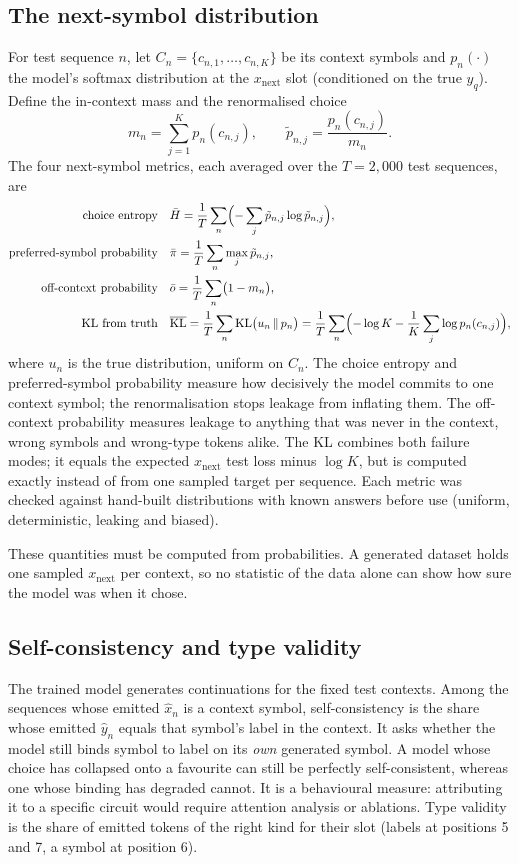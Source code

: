 \documentclass[11pt,a4paper]{article}
\newcommand{\xnext}{x_{\mathrm{next}}}
\newcommand{\yq}{y_{q}}
\newcommand{\KL}{\mathrm{KL}}
\begin{document}
\subsection{The next-symbol distribution}\label{sec:nextsym}
For test sequence $n$, let $C_n=\{c_{n,1},\dots,c_{n,K}\}$ be its context
symbols and $p_n(\cdot)$ the model's softmax distribution at the $\xnext$
slot (conditioned on the true $\yq$). Define the in-context mass and the
renormalised choice
\[
  m_n=\sum_{j=1}^{K}p_n(c_{n,j}),\qquad
  \tilde p_{n,j}=\frac{p_n(c_{n,j})}{m_n}.
\]
The four next-symbol metrics, each averaged over the $T=2{,}000$ test
sequences, are
\begin{align}
  \text{choice entropy}\quad &\bar H=\frac1T\sum_{n}\Bigl(-\sum_{j}\tilde p_{n,j}\log\tilde p_{n,j}\Bigr), \\
  \text{preferred-symbol probability}\quad &\bar\pi=\frac1T\sum_{n}\max_j\tilde p_{n,j}, \\
  \text{off-context probability}\quad &\bar o=\frac1T\sum_{n}\bigl(1-m_n\bigr), \\
  \text{KL from truth}\quad &\overline{\KL}=\frac1T\sum_{n}\KL\bigl(u_n\,\|\,p_n\bigr)
     =\frac1T\sum_{n}\Bigl(-\log K-\frac1K\sum_{j}\log p_n(c_{n,j})\Bigr),
\end{align}
where $u_n$ is the true distribution, uniform on $C_n$. The choice entropy and
preferred-symbol probability measure how decisively the model commits to one
context symbol; the renormalisation stops leakage from inflating them. The
off-context probability measures leakage to anything that was never in the
context, wrong symbols and wrong-type tokens alike. The KL combines both
failure modes; it equals the expected $\xnext$ test loss minus $\log K$, but is
computed exactly instead of from one sampled target per sequence. Each metric
was checked against hand-built distributions with known answers before use
(uniform, deterministic, leaking and biased).

These quantities must be computed from probabilities. A generated dataset
holds one sampled $\xnext$ per context, so no statistic of the data alone can
show how sure the model was when it chose.

\subsection{Self-consistency and type validity}
The trained model generates continuations for the fixed test contexts. Among
the sequences whose emitted $\hat x_n$ is a context symbol, self-consistency is
the share whose emitted $\hat y_n$ equals that symbol's label in the context.
It asks whether the model still binds symbol to label on its \emph{own}
generated symbol. A model whose choice has collapsed onto a favourite can
still be perfectly self-consistent, whereas one whose binding has degraded
cannot. It is a behavioural measure: attributing it to a specific circuit
would require attention analysis or ablations. Type validity is the share of
emitted tokens of the right kind for their slot (labels at positions 5 and 7,
a symbol at position 6).
\end{document}

